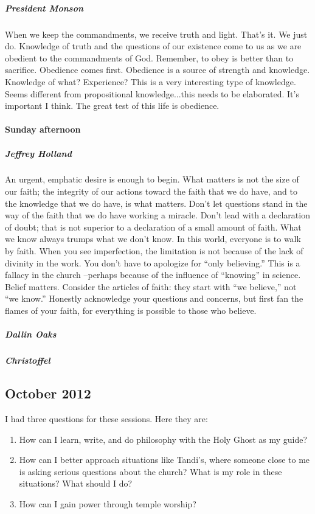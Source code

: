 \subparagraph*{President Monson} When we keep the commandments, we receive truth and light. That's it. We just do. Knowledge of truth and the questions of our existence come to us as we are obedient to the commandments of God. Remember, to obey is better than to sacrifice. Obedience comes first. Obedience is a source of strength and knowledge. Knowledge of what? Experience? This is a very interesting type of knowledge. Seems different from propositional knowledge...this needs to be elaborated. It's important I think. The great test of this life is obedience.

\paragraph*{Sunday afternoon}

\subparagraph*{Jeffrey Holland} An urgent, emphatic desire is enough to begin. What matters is not the size of our faith; the integrity of our actions toward the faith that we do have, and to the knowledge that we do have, is what matters. Don't let questions stand in the way of the faith that we do have working a miracle. Don't lead with a declaration of doubt; that is not superior to a declaration of a small amount of faith. What we know always trumps what we don't know. In this world, everyone is to walk by faith. When you see imperfection, the limitation is not because of the lack of divinity in the work. You don't have to apologize for ``only believing.'' This is a fallacy in the church --perhaps because of the influence of ``knowing'' in science. Belief matters. Consider the articles of faith: they start with ``we believe,'' not ``we know.'' Honestly acknowledge your questions and concerns, but first fan the flames of your faith, for everything is possible to those who believe.

\subparagraph*{Dallin Oaks}

\subparagraph*{Christoffel}

\subsection{October 2012}

I had three questions for these sessions. Here they are:

\begin{enumerate}
\item How can I learn, write, and do philosophy with the Holy Ghost as my guide?
\item How can I better approach situations like Tandi's, where someone close to me is asking serious questions about the church? What is my role in these situations? What should I do?
\item How can I gain power through temple worship?
\end{enumerate}

